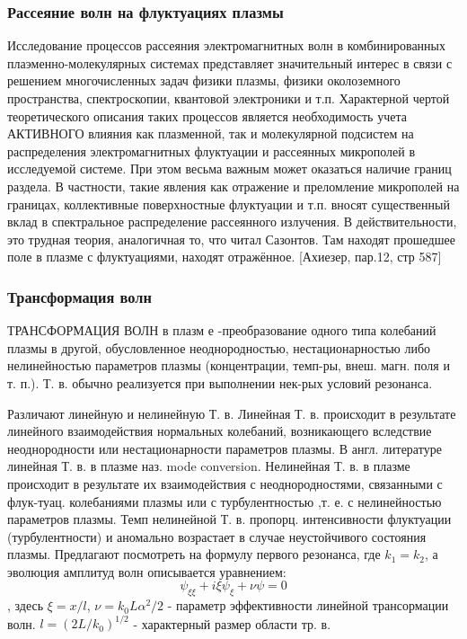 \documentclass[10pt, a4paper]{article}
\begin{document}
\subsubsection{Рассеяние волн на флуктуациях плазмы}
Исследование процессов рассеяния электромагнитных волн
в комбинированных плаэменно-молекулярных системах представляет значительный интерес в связи с решением многочисленных
задач физики плазмы, физики околоземного пространства, спектроскопии, квантовой электроники и т.п. Характерной чертой
теоретического описания таких процессов является необходимость учета АКТИВНОГО влияния как плазменной, так и молекулярной подсистем на распределения электромагнитных флуктуации и рассеянных микрополей в исследуемой системе. При
этом весьма важным может оказаться наличие границ раздела.
В частности, такие явления как отражение и преломление
микрополей на границах, коллективные поверхностные флуктуации и т.п. вносят существенный вклад в спектральное распределение рассеянного излучения.
В действительности, это трудная теория, аналогичная то, что читал Сазонтов. Там находят прошедшее поле в плазме с флуктуациями, находят отражённое.
[Ахиезер, пар.12, стр 587]

\subsubsection{Трансформация волн}
ТРАНСФОРМАЦИЯ ВОЛН в плазм е -преобразование одного типа колебаний плазмы в другой, обусловленное неоднородностью, нестационарностью либо нелинейностью параметров плазмы (концентрации, темп-ры, внеш. магн. поля и т. п.). Т. в. обычно реализуется при выполнении нек-рых условий резонанса.

Различают линейную и нелинейную Т. в. Линейная Т. в. происходит в результате линейного взаимодействия нормальных колебаний, возникающего вследствие неоднородности или нестационарности параметров плазмы. В англ. литературе линейная Т. в. в плазме наз. mode conversion. Нелинейная Т. в. в плазме происходит в результате их взаимодействия с неоднородностями, связанными с флук-туац. колебаниями плазмы или с турбулентностью ,т. е. с нелинейностью параметров плазмы. Темп нелинейной Т. в. пропорц. интенсивности флуктуации (турбулентности) и аномально возрастает в случае неустойчивого состояния плазмы.
Предлагают посмотреть на формулу первого резонанса, где $k_1=k_2$, а эволюция амплитуд волн описывается уравнением:
\begin{equation}
	\psi_{\xi \xi} + i\xi \psi_{\xi} + \nu \psi =0
\end{equation}
, здесь $\xi=x/l$, $\nu=k_0 L \alpha^2 /2$ - параметр эффективности линейной трансормации волн. $l=(2L/k_0)^{1/2}$ - характерный размер области тр. в.
\end{document}
